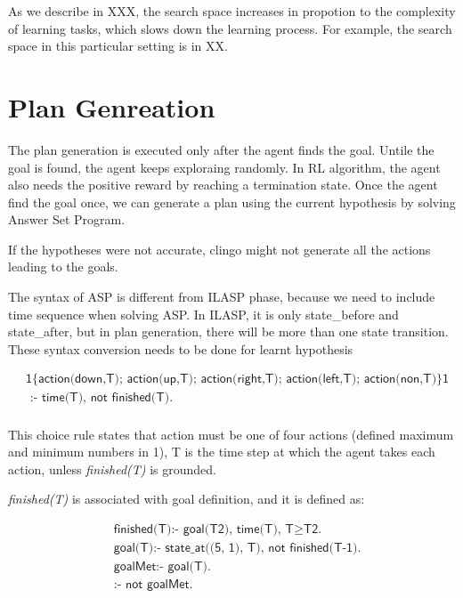 As we describe in XXX, the search space increases in propotion to the complexity of learning tasks, which slows down the learning process.
For example, the search space in this particular setting is in XX.

\section{Plan Genreation}
\label{Plan_genreation}

The plan generation is executed only after the agent finds the goal. Untile the goal is found, the agent keeps exploraing randomly.
In RL algorithm, the agent also needs the positive reward by reaching a termination state. 
Once the agent find the goal once, we can generate a plan using the current hypothesis by solving Answer Set Program.

If the hypotheses were not accurate, clingo might not generate all the actions leading to the goals.

The syntax of ASP is different from ILASP phase, because we need to include time sequence when solving ASP.
In ILASP, it is only state\_before and state\_after, but in plan generation, there will be more than one state transition.
These syntax conversion needs to be done for learnt hypothesis

\begin{equation}
\begin{split}
&\textsf{1\{action(down,T); action(up,T); action(right,T); action(left,T); action(non,T)\}1} \\
&\textsf{ :- time(T), not finished(T).}\\
\end{split}
\end{equation}

This choice rule states that action must be one of four actions (defined maximum and minimum numbers in 1),
T is the time step at which the agent takes each action, unless \textit{finished(T)} is grounded.

\textit{finished(T)} is associated with goal definition, and it is defined as:

\begin{equation}
\begin{split}
&\textsf{finished(T):- goal(T2), time(T), T} \geq \textsf{T2.}\\
&\textsf{goal(T):- state\_at((5, 1), T), not finished(T-1).}\\
&\textsf{goalMet:- goal(T).}\\
&\textsf{:- not goalMet.}
\end{split}
\end{equation}

